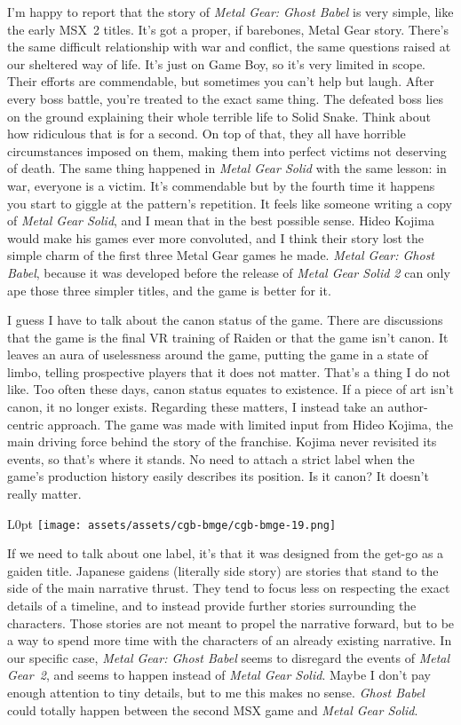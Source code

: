 \documentclass{book}
\begin{document}
I’m happy to report that the story of \emph{Metal Gear: Ghost Babel} is very simple, like the early MSX 2 titles. It’s got a proper, if barebones, Metal Gear story. There’s the same difficult relationship with war and conflict, the same questions raised at our sheltered way of life. It’s just on Game Boy, so it’s very limited in scope. Their efforts are commendable, but sometimes you can’t help but laugh. After every boss battle, you’re treated to the exact same thing. The defeated boss lies on the ground explaining their whole terrible life to Solid Snake. Think about how ridiculous that is for a second. On top of that, they all have horrible circumstances imposed on them, making them into perfect victims not deserving of death. The same thing happened in \emph{Metal Gear Solid} with the same lesson: in war, everyone is a victim. It’s commendable but by the fourth time it happens you start to giggle at the pattern’s repetition. It feels like someone writing a copy of \emph{Metal Gear Solid}, and I mean that in the best possible sense. Hideo Kojima would make his games ever more convoluted, and I think their story lost the simple charm of the first three Metal Gear games he made. \emph{Metal Gear: Ghost Babel}, because it was developed before the release of \emph{Metal Gear Solid 2} can only ape those three simpler titles, and the game is better for it.

I guess I have to talk about the canon status of the game. There are discussions that the game is the final VR training of Raiden or that the game isn’t canon. It leaves an aura of uselessness around the game, putting the game in a state of limbo, telling prospective players that it does not matter. That’s a thing I do not like. Too often these days, canon status equates to existence. If a piece of art isn’t canon, it no longer exists. Regarding these matters, I instead take an author-centric approach. The game was made with limited input from Hideo Kojima, the main driving force behind the story of the franchise. Kojima never revisited its events, so that’s where it stands. No need to attach a strict label when the game’s production history easily describes its position. Is it canon? It doesn’t really matter.

\begin{wrapfigure}{L}{0pt} \texttt{[image: assets/assets/cgb-bmge/cgb-bmge-19.png]}\end{wrapfigure}
If we need to talk about one label, it’s that it was designed from the get-go as a gaiden title. Japanese gaidens (literally side story) are stories that stand to the side of the main narrative thrust. They tend to focus less on respecting the exact details of a timeline, and to instead provide further stories surrounding the characters. Those stories are not meant to propel the narrative forward, but to be a way to spend more time with the characters of an already existing narrative. In our specific case, \emph{Metal Gear: Ghost Babel} seems to disregard the events of \emph{Metal Gear 2}, and seems to happen instead of \emph{Metal Gear Solid}. Maybe I don’t pay enough attention to tiny details, but to me this makes no sense. \emph{Ghost Babel} could totally happen between the second MSX game and \emph{Metal Gear Solid}.
\end{document}
